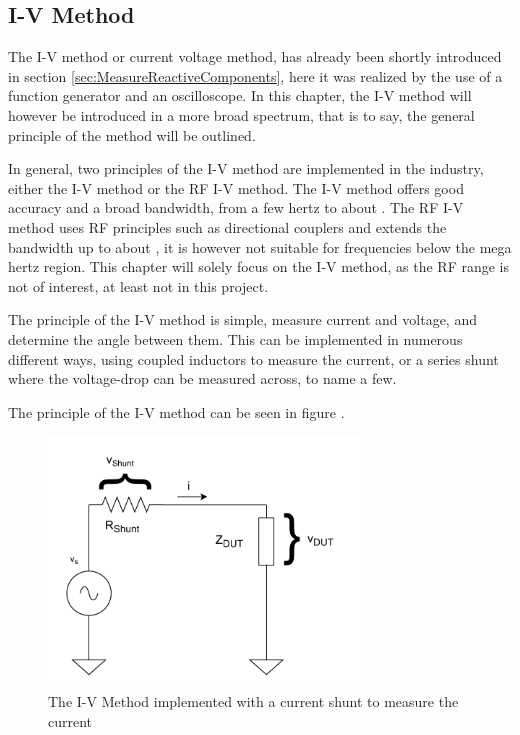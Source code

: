 \subsection{I-V Method} \label{ssec:IVMethod}
The I-V method or current voltage method, has already been shortly introduced in section \ref{sec:MeasureReactiveComponents}, here it was realized by the use of a function generator and an oscilloscope. In this chapter, the I-V method will however be introduced in a more broad spectrum, that is to say, the general principle of the method will be outlined.

In general, two principles of the I-V method are implemented in the industry, either the I-V method or the RF I-V method. The I-V method offers good accuracy 
and a broad bandwidth, from a few hertz to about . The RF I-V method uses RF principles such as directional couplers and extends the bandwidth up to about , it is however not suitable for frequencies below the mega hertz region\cite{Keysight_Impedance}. This chapter will solely focus on the I-V method, as the RF range is not of interest, at least not in this project.

The principle of the I-V method is simple, measure current and voltage, and determine the angle between them. This can be implemented in numerous different ways, using coupled inductors to measure the current, or a series shunt where the voltage-drop can be measured across, to name a few. 

The principle of the I-V method can be seen in figure .

\begin{figure}[H]
    \centering
    \includegraphics[width=0.75\textwidth]{Sections/4_TechnicalAnalysis/Figures_JFT/IV_Method.pdf}
    \caption{The I-V Method implemented with a current shunt to measure the current}
    \label{fig_4_2_IVMethod}
\end{figure}

